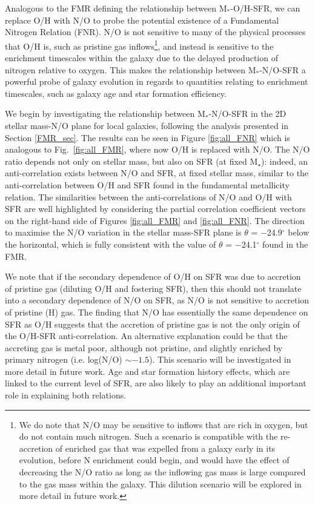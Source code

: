 \documentclass[usenatbib]{mnras} %
\begin{document}
Analogous to the FMR defining the relationship between M$_*$-O/H-SFR, we can replace O/H with N/O to probe the potential existence of a Fundamental Nitrogen Relation (FNR). N/O is not sensitive to many of the physical processes that O/H is, such as pristine gas inflows\footnote{We do note that N/O may be sensitive to inflows that are rich in oxygen, but do not contain much nitrogen. Such a scenario is compatible with the re-accretion of enriched gas that was expelled from a galaxy early in its evolution, before N enrichment could begin, and would have the effect of decreasing the N/O ratio as long as the inflowing gas mass is large compared to the gas mass within the galaxy. This dilution scenario will be explored in more detail in future work.}, and instead is sensitive to the enrichment timescales within the galaxy due to the delayed production of nitrogen relative to oxygen. This makes the relationship between M$_*$-N/O-SFR a powerful probe of galaxy evolution in regards to quantities relating to enrichment timescales, such as galaxy age and star formation efficiency.

We begin by investigating the relationship between M$_*$-N/O-SFR in the 2D stellar mass-N/O plane for local galaxies, following the analysis presented in Section \ref{FMR_sec}. The results can be seen in Figure \ref{fig:all_FNR} which is analogous to Fig.~\ref{fig:all_FMR}, where now O/H is replaced with N/O. The N/O ratio depends not only on stellar mass, but also on SFR (at fixed M$_{\star}$): indeed, an anti-correlation exists between N/O and SFR, at fixed stellar mass, similar to the anti-correlation between O/H and SFR found in the fundamental metallicity relation. The similarities between the anti-correlations of N/O and O/H with SFR are well highlighted by considering the partial correlation coefficient vectors on the right-hand side of Figures \ref{fig:all_FMR} and \ref{fig:all_FNR}. The direction to maximise the N/O variation in the stellar mass-SFR plane is $\theta$ = $-$24.9$^{\circ}$ below the horizontal, which is fully consistent with the value of $\theta$ = $-$24.1$^{\circ}$ found in the FMR.



We note that if the secondary dependence of O/H on SFR was due to accretion of pristine gas (diluting O/H and fostering SFR), then this should not translate into a secondary dependence of N/O on SFR, as N/O is not sensitive to accretion of pristine (H) gas. The finding that N/O has essentially the same dependence on SFR as O/H suggests that the accretion of pristine gas is not the only origin of the O/H-SFR anti-correlation. An alternative explanation could be that the accreting gas is metal poor, although not pristine, and slightly enriched by primary nitrogen (i.e. log(N/O) $\sim -1.5$). This scenario will be investigated in more detail in future work. Age and star formation history effects, which are linked to the current level of SFR, are also likely to play an additional important role in explaining both relations.
\end{document}
